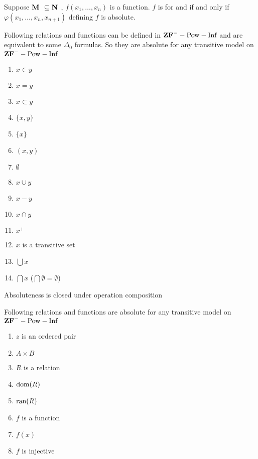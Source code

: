 \documentclass[11pt]{article}
\begin{document}
\begin{definition}[]
Suppose \(\textbf{M }\subseteq\textbf{N }\), \(f(x_1,\dots,x_n)\) is a function. \(f\) is
 for \cm and \cn if and only if \(\varphi(x_1,\dots,x_n,x_{n+1})\)
defining \(f\) is absolute.
\end{definition}

\begin{theorem}[]
Following relations and functions can be defined in
\(\textbf{ZF}^--\text{Pow}-\text{Inf}\) and are equivalent to some \(\Delta_0\) formulas.
So they are absolute for any transitive model \cm on 
\(\textbf{ZF}^--\text{Pow}-\text{Inf}\)
\begin{enumerate}
\item \(x\in y\)
\item \(x=y\)
\item \(x\subset y\)
\item \(\{x,y\}\)
\item \(\{x\}\)

\item \((x,y)\)
\item \(\emptyset\)
\item \(x\cup y\)
\item \(x-y\)
\item \(x\cap y\)
\item \(x^+\)
\item \(x\) is a transitive set
\item \(\bigcup x\)
\item \(\bigcap x\) (\(\bigcap\emptyset=\emptyset\))
\end{enumerate}
\end{theorem}

\begin{lemma}[]
Absoluteness is closed under operation composition
\end{lemma}

\begin{theorem}[]
Following relations and functions are absolute for any transitive model \cm on 
\(\textbf{ZF}^--\text{Pow}-\text{Inf}\)
\begin{enumerate}
\item \(z\) is an ordered pair
\item \(A\times B\)
\item \(R\) is a relation
\item \(\mathrm{dom}{(R)}\)
\item \(\mathrm{ran}{(R)}\)
\item \(f\) is a function
\item \(f(x)\)
\item \(f\) is injective
\end{enumerate}
\end{theorem}
\end{document}
